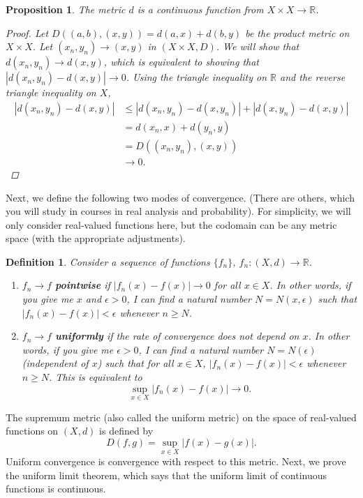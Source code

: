 \documentclass[12pt]{amsart}         %
\newtheorem{definition}{Definition}[section]
\newtheorem{proposition}{Proposition}[section]
\theoremstyle{remark}
\newcommand{\R}{\mathbb{R}}
\begin{document}
\begin{proposition}
The metric $d$ is a continuous function from $X \times X \rightarrow \R$.
\begin{proof}
Let $D\left((a,b),(x,y)\right) = d(a,x)+d(b,y)$ be the product metric on $X \times X$. Let $(x_n, y_n) \rightarrow (x, y)$ in $(X \times X, D)$. We will show that $d(x_n,y_n) \rightarrow d(x,y)$, which is equivalent to showing that $|d(x_n, y_n) - d(x,y)| \rightarrow 0$. Using the triangle inequality on $\R$ and the reverse triangle inequality on $X$,
\begin{align*}
    |d(x_n, y_n) - d(x,y)| &\leq |d(x_n, y_n) - d(x, y_n)| + |d(x, y_n) - d(x,y)| \\
    &= d(x_n, x) + d(y_n, y) \\
    &= D((x_n, y_n), (x, y)) \\
    &\rightarrow 0.
\end{align*}
\end{proof}
\end{proposition}

Next, we define the following two modes of convergence. (There are others, which you will study in courses in real analysis and probability). For simplicity, we will only consider real-valued functions here, but the codomain can be any metric space (with the appropriate adjustments).

\begin{definition}
Consider a sequence of functions $\{f_n\}$, $f_n:(X, d) \rightarrow \R$. 
\begin{enumerate}
    \item $f_n \rightarrow f$ \textbf{pointwise} if $|f_n(x) - f(x)| \rightarrow 0$ for all $x \in X$. In other words, if you give me $x$ and $\epsilon > 0$, I can find a natural number $N = N(x, \epsilon)$ such that $|f_n(x) - f(x)| < \epsilon$ whenever $n \geq N$.
    \item $f_n \rightarrow f$ \textbf{uniformly} if the rate of convergence does not depend on $x$. In other words, if you give me $\epsilon > 0$, I can find a natural number $N = N(\epsilon)$ (independent of $x$) such that for all $x \in X$, $|f_n(x) - f(x)| < \epsilon$ whenever $n \geq N$. This is equivalent to
    \[
    \sup_{x \in X}|f_n(x) - f(x)| \rightarrow 0.
    \]
\end{enumerate}
\end{definition}

The supremum metric (also called the uniform metric) on the space of real-valued functions on $(X, d)$ is defined by
\[
D(f,g) = \sup_{x \in X}|f(x) - g(x)|.
\]
Uniform convergence is convergence with respect to this metric. Next, we prove the uniform limit theorem, which says that the uniform limit of continuous functions is continuous.
\end{document}
